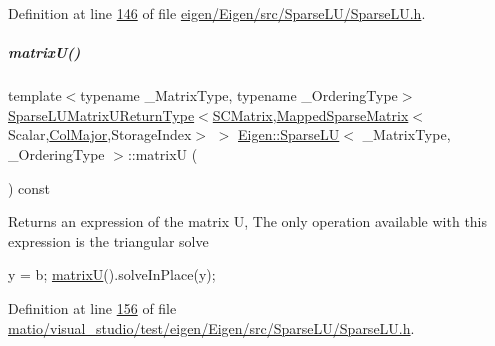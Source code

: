 Definition at line \hyperlink{eigen_2_eigen_2src_2_sparse_l_u_2_sparse_l_u_8h_source_l00146}{146} of file \hyperlink{eigen_2_eigen_2src_2_sparse_l_u_2_sparse_l_u_8h_source}{eigen/\+Eigen/src/\+Sparse\+L\+U/\+Sparse\+L\+U.\+h}.

\mbox{\label{group___sparse_l_u___module_aaf395a8fca527144215ff19cc7b8b637}} 
\subparagraph{\texorpdfstring{matrix\+U()}{matrixU()}\hspace{0.1cm}{\footnotesize\ttfamily [1/2]}}
{\footnotesize\ttfamily template$<$typename \+\_\+\+Matrix\+Type, typename \+\_\+\+Ordering\+Type$>$ \\
\hyperlink{struct_eigen_1_1_sparse_l_u_matrix_u_return_type}{Sparse\+L\+U\+Matrix\+U\+Return\+Type}$<$\hyperlink{group___sparse_l_u___module}{S\+C\+Matrix},\hyperlink{class_eigen_1_1_mapped_sparse_matrix}{Mapped\+Sparse\+Matrix}$<$Scalar,\hyperlink{group__enums_ggaacded1a18ae58b0f554751f6cdf9eb13a0cbd4bdd0abcfc0224c5fcb5e4f6669a}{Col\+Major},Storage\+Index$>$ $>$ \hyperlink{group___sparse_l_u___module_class_eigen_1_1_sparse_l_u}{Eigen\+::\+Sparse\+LU}$<$ \+\_\+\+Matrix\+Type, \+\_\+\+Ordering\+Type $>$\+::matrixU (\begin{DoxyParamCaption}{ }\end{DoxyParamCaption}) const\hspace{0.3cm}{\ttfamily [inline]}}

\begin{DoxyReturn}{Returns}
an expression of the matrix U, The only operation available with this expression is the triangular solve 
\begin{DoxyCode}
y = b; \hyperlink{group___sparse_l_u___module_aaf395a8fca527144215ff19cc7b8b637}{matrixU}().solveInPlace(y);
\end{DoxyCode}
 
\end{DoxyReturn}


Definition at line \hyperlink{matio_2visual__studio_2test_2eigen_2_eigen_2src_2_sparse_l_u_2_sparse_l_u_8h_source_l00156}{156} of file \hyperlink{matio_2visual__studio_2test_2eigen_2_eigen_2src_2_sparse_l_u_2_sparse_l_u_8h_source}{matio/visual\+\_\+studio/test/eigen/\+Eigen/src/\+Sparse\+L\+U/\+Sparse\+L\+U.\+h}.

